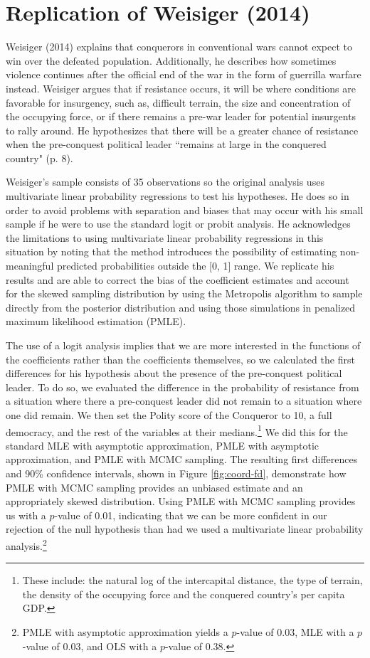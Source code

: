\documentclass[12pt]{article}
\begin{document}
\section*{Replication of Weisiger (2014)}
Weisiger (2014) explains that conquerors in conventional wars cannot expect to win over the defeated population. Additionally, he describes how sometimes violence continues after the official end of the war in the form of guerrilla warfare instead. Weisiger argues that if resistance occurs, it will be where conditions are favorable for insurgency, such as, difficult terrain, the size and concentration of the occupying force, or if there remains a pre-war leader for potential insurgents to rally around. He hypothesizes that there will be a greater chance of resistance when the pre-conquest political leader ``remains at large in the conquered country" (p. 8).

Weisiger's sample consists of 35 observations so the original analysis uses multivariate linear probability regressions to test his hypotheses. He does so in order to avoid problems with separation and biases that may occur with his small sample if he were to use the standard logit or probit analysis. He acknowledges the limitations to using multivariate linear probability regressions in this situation by noting that the method introduces the possibility of estimating non-meaningful predicted probabilities outside the [0, 1] range. We replicate his results and are able to correct the bias of the coefficient estimates and account for the skewed sampling distribution by using the Metropolis algorithm to sample directly from the posterior distribution and using those simulations in penalized maximum likelihood estimation (PMLE). 

The use of a logit analysis implies that we are more interested in the functions of the coefficients rather than the coefficients themselves, so we calculated the first differences for his hypothesis about the presence of the pre-conquest political leader. To do so, we evaluated the difference in the probability of resistance from a situation where there a pre-conquest leader did not remain to a situation where one did remain. We then set the Polity score of the Conqueror to 10, a full democracy, and the rest of the variables at their medians.\footnote{These include: the natural log of the intercapital distance, the type of terrain, the density of the occupying force and the conquered country's per capita GDP.}  We did this for the standard MLE with asymptotic approximation, PMLE with asymptotic approximation, and PMLE with MCMC sampling. The resulting first differences and 90\% confidence intervals, shown in Figure \ref{fig:coord-fd}, demonstrate how PMLE with MCMC sampling provides an unbiased estimate and an appropriately skewed distribution. Using PMLE with MCMC sampling provides us with a $p$-value of 0.01, indicating that we can be more confident in our rejection of the null hypothesis than had we used a multivariate linear probability analysis.\footnote{PMLE with asymptotic approximation yields a $p$-value of 0.03, MLE with a $p$-value of 0.03, and OLS with a $p$-value of 0.38.} 
\end{document}
